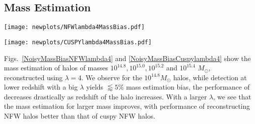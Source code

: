\subsection{Mass Estimation}
\begin{figure*}
\begin{center}
    \texttt{[image: newplots/NFWlambda4MassBias.pdf]}
     \caption{
     NFW halo Mass Bias for $M=10^{14.8}, 10^{15.0}, 10^{15.2},$ and $
     10^{15.4}$   $M_{\odot}$ respectively, reconstructed using $\lambda=4$.
     The darker grey area indicate a $5\%$ bias and the lighter grey area
     indicate a $20\%$ mass bias. The error bar indicate
    the standard deviation of reconstructed mass with respect to $\frac{a}{c}$ over the range
    $[0.5,1]$.
     }
     \label{NoisyMassBiasNFWlambda4}
\end{center}

\end{figure*}

\begin{figure*}
\begin{center}
\texttt{[image: newplots/CUSPYlambda4MassBias.pdf]}
\caption{
    Cuspy NFW halo Mass Bias for $M=10^{14.8}, 10^{15.0}, 10^{15.2},$ and $
    10^{15.4}$ $M_{\odot}$ respectively, reconstructed using $\lambda=4$. The
    darker grey area indicate a $5\%$ bias and the lighter grey area indicate a
    $20\%$ mass bias. The error bar indicate
    the standard deviation of reconstructed mass with respect to $\frac{a}{c}$ over the range
    $[0.5,1]$.
    }
    \label{NoisyMassBiasCuspylambda4}
\end{center}
\end{figure*}

Figs.~\ref{NoisyMassBiasNFWlambda4} and \ref{NoisyMassBiasCuspylambda4} show
the mass estimation of halos of masses $10^{14.8}, 10^{15.0}, 10^{15.2}$ and
$10^{15.4}$ $M_{\odot}$, reconstructed using $\lambda=4$. We observe for the $10^{14.8}M_\odot$ halos, while detection at lower redshift with a big $\lambda$ yields $\lessapprox 5\%$ mass
estimation bias, the
performance of \splinv{} decreases drastically as redshift of the halo
increases. With a larger $\lambda$, we see that the mass estimation for larger
mass improves, with performance of reconstructing NFW halos better than that of
cuspy NFW halos.

